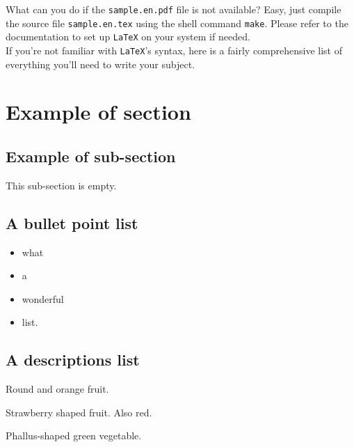 \documentclass{42-en}
\begin{document}
    What can you do if the \texttt{sample.en.pdf} file is not available?
    Easy, just compile the source file \texttt{sample.en.tex} using
    the shell command \texttt{make}. Please refer to the documentation
    to set up \texttt{LaTeX} on your system if needed.\\

    If you're not familiar with \texttt{LaTeX}'s syntax, here is a
    fairly comprehensive list of everything you'll need to write your
    subject.\\


    \section{Example of section}


        \subsection{Example of sub-section}

           This sub-section is empty.


        \newpage


        \subsection{A bullet point list}

            \begin{itemize}\itemsep1pt
                \item what
                \item a
                \item wonderful
                \item list.\\
            \end{itemize}


        \subsection{A descriptions list}

            \begin{description}\itemsep3pt
                \item [Orange:] Round and orange fruit.
                \item [Strawberry:] Strawberry shaped fruit. Also red.
                \item [Cucumber:] Phallus-shaped green vegetable.\\
            \end{description}
\end{document}
